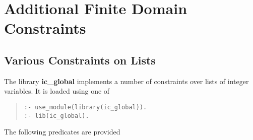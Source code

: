 %
% 
% 
% 
% 
%
%
%

\chapter{Additional Finite Domain Constraints}
\label{chapglobconstr}
\section{Various Constraints on Lists}

The library {\bf ic_global} implements a number of constraints
over lists of integer variables. It is loaded using one of 
\begin{quote}\begin{verbatim}
:- use_module(library(ic_global)).
:- lib(ic_global).
\end{verbatim}\end{quote}

The following predicates are provided

